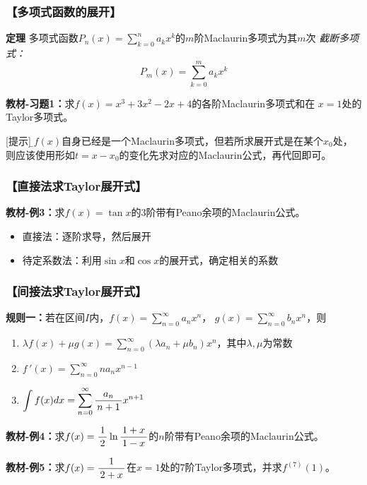 \subsubsection{【多项式函数的展开】}

{\bf 定理}
多项式函数$P_n(x)=\sum\limits_{k=0}^na_kx^k$的$m$阶Maclaurin多项式为其$m$次
{\it 截断多项式：} 
$${P_m(x)=\sum\limits_{k=0}^ma_kx^k}$$

{\bf 教材-习题1：}求$f(x)=x^3+3x^2-2x+4$的各阶Maclaurin多项式和在
$x=1$处的Taylor多项式。

[提示]：{\b$f(x)$自身已经是一个Maclaurin多项式，但若所求展开式是在某个$x_0$处，
则应该使用形如$t=x-x_0$的变化先求对应的Maclaurin公式，再代回即可。}

\subsubsection{【直接法求Taylor展开式】}

{\bf 教材-例3：}求$f(x)=\tan x$的$3$阶带有Peano余项的Maclaurin公式。

\begin{itemize}
  \setlength{\itemindent}{1cm}
  \item 直接法：逐阶求导，然后展开
  \item 待定系数法：利用$\sin x$和$\cos x$的展开式，确定相关的系数
\end{itemize}

\subsubsection{【间接法求Taylor展开式】}

{\bf 规则一：}若在区间$I$内，$f(x)=\sum\limits_{n=0}^{\infty}a_nx^n$，
$g(x)=\sum\limits_{n=0}^{\infty}b_nx^n$，则
\begin{enumerate}[(1)]
  \setlength{\itemindent}{1cm}
  \item $\lambda f(x)+\mu g(x)=\sum\limits_{n=0}^{\infty}(\lambda a_n+\mu
  b_n)x^n$，其中$\lambda,\mu$为常数 
  \item $f\,'(x)=\sum\limits_{n=0}^{\infty}na_{n}x^{n-1}$ 
  \item $\displaystyle\int f(x)dx=\sum\limits_{n=0}^{\infty}
  \displaystyle\frac{\,{a_{n}}\,}{\,{n+1}\,}x^{n+1}$
\end{enumerate}

{\bf 教材-例4：}求$f(x)=\displaystyle\frac{\,{1}\,}{\,{2}\,}\ln\displaystyle\frac{\,{1+x}\,}{\,{1-x}\,}$的$n$阶带有Peano余项的Maclaurin公式。

{\bf 教材-例5：}求$f(x)=\displaystyle\frac{\,{1}\,}{\,{2+x}\,}$在$x=1$处的$7$阶Taylor多项式，并求$f^{(7)}(1)$。

